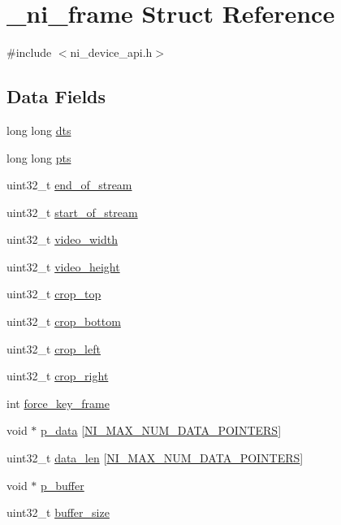 \hypertarget{struct__ni__frame}{}\section{\+\_\+ni\+\_\+frame Struct Reference}
\label{struct__ni__frame}


{\ttfamily \#include $<$ni\+\_\+device\+\_\+api.\+h$>$}

\subsection*{Data Fields}
\begin{DoxyCompactItemize}
\item 
long long \mbox{\hyperlink{struct__ni__frame_a5b339e32ee63aeb67076062ba959ca51}{dts}}
\item 
long long \mbox{\hyperlink{struct__ni__frame_aa549d909938aa26820c29b020cd43ad6}{pts}}
\item 
uint32\+\_\+t \mbox{\hyperlink{struct__ni__frame_a7cd60f79487efa52ff89303532a085fb}{end\+\_\+of\+\_\+stream}}
\item 
uint32\+\_\+t \mbox{\hyperlink{struct__ni__frame_a3136d4ad964deb437b6aaadcb031d90f}{start\+\_\+of\+\_\+stream}}
\item 
uint32\+\_\+t \mbox{\hyperlink{struct__ni__frame_a94c61f9d8155afb285177936e9fa30ce}{video\+\_\+width}}
\item 
uint32\+\_\+t \mbox{\hyperlink{struct__ni__frame_af65e7328fad30f40770959957538da7c}{video\+\_\+height}}
\item 
uint32\+\_\+t \mbox{\hyperlink{struct__ni__frame_a2558646f2dacf6b78c7e2af61c1c3a66}{crop\+\_\+top}}
\item 
uint32\+\_\+t \mbox{\hyperlink{struct__ni__frame_a94c03dfca2d0c8f67ef1b4fec9190b97}{crop\+\_\+bottom}}
\item 
uint32\+\_\+t \mbox{\hyperlink{struct__ni__frame_ac104de359eae4cad0858caac68e4dae1}{crop\+\_\+left}}
\item 
uint32\+\_\+t \mbox{\hyperlink{struct__ni__frame_a8cc639a91d2316c8edcc80c43d8f2997}{crop\+\_\+right}}
\item 
int \mbox{\hyperlink{struct__ni__frame_a0c0dbb0d46bfff00f7a71a8ea2e993ab}{force\+\_\+key\+\_\+frame}}
\item 
void $\ast$ \mbox{\hyperlink{struct__ni__frame_a13127a830580c25a1fbd82987057af9a}{p\+\_\+data}} \mbox{[}\mbox{\hyperlink{ni__device__api_8h_a31f22c2de7d8a94f2e33552cf704545a}{N\+I\+\_\+\+M\+A\+X\+\_\+\+N\+U\+M\+\_\+\+D\+A\+T\+A\+\_\+\+P\+O\+I\+N\+T\+E\+RS}}\mbox{]}
\item 
uint32\+\_\+t \mbox{\hyperlink{struct__ni__frame_a1a8409b0329d97e559c776a923788f18}{data\+\_\+len}} \mbox{[}\mbox{\hyperlink{ni__device__api_8h_a31f22c2de7d8a94f2e33552cf704545a}{N\+I\+\_\+\+M\+A\+X\+\_\+\+N\+U\+M\+\_\+\+D\+A\+T\+A\+\_\+\+P\+O\+I\+N\+T\+E\+RS}}\mbox{]}
\item 
void $\ast$ \mbox{\hyperlink{struct__ni__frame_ac5f1b38d538f42b0a45acd833ea5fc65}{p\+\_\+buffer}}
\item 
uint32\+\_\+t \mbox{\hyperlink{struct__ni__frame_ab4bab919e0d995ad7249474cd9028105}{buffer\+\_\+size}}
\end{DoxyCompactItemize}



